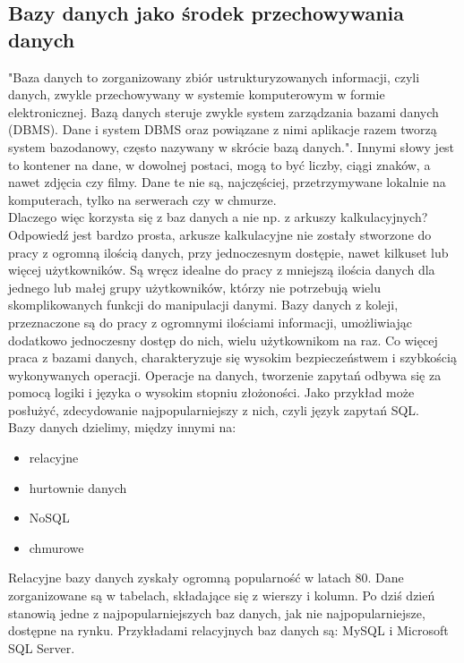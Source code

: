\documentclass[12pt]{article}
\begin{document}
\begin{sloppypar}
{  \subsection{Bazy danych jako środek przechowywania danych}
  {
    "Baza danych to zorganizowany zbiór ustrukturyzowanych informacji, czyli danych, zwykle przechowywany w systemie komputerowym w formie elektronicznej. 
    Bazą danych steruje zwykle system zarządzania bazami danych (DBMS). 
    Dane i system DBMS oraz powiązane z nimi aplikacje razem tworzą system bazodanowy, często nazywany w skrócie bazą danych.". \cite{oracle-db}
    Innymi słowy jest to kontener na dane, w dowolnej postaci, mogą to być liczby, ciągi znaków, a nawet zdjęcia czy filmy. Dane te nie są, najczęściej, przetrzymywane
    lokalnie na komputerach, tylko na serwerach czy w chmurze. \\
    Dlaczego więc korzysta się z baz danych a nie np. z arkuszy kalkulacyjnych?\\
    Odpowiedź jest bardzo prosta, arkusze kalkulacyjne nie zostały stworzone do pracy z ogromną ilością danych, przy jednoczesnym dostępie, nawet kilkuset lub więcej użytkowników.
    Są wręcz idealne do pracy z mniejszą ilościa danych dla jednego lub małej grupy użytkowników, którzy nie potrzebują wielu skomplikowanych funkcji do manipulacji danymi.
    Bazy danych z koleji, przeznaczone są do pracy z ogromnymi ilościami informacji, umożliwiając dodatkowo jednoczesny dostęp do nich, wielu użytkownikom na raz. 
    Co więcej praca z bazami danych, charakteryzuje się wysokim bezpieczeństwem i szybkością wykonywanych operacji. Operacje na danych, tworzenie zapytań odbywa się 
    za pomocą logiki i języka o wysokim stopniu złożoności. Jako przykład może posłużyć, zdecydowanie najpopularniejszy z nich, czyli język zapytań SQL.\\
    Bazy danych dzielimy, między innymi na:
    \begin{itemize}
      \item relacyjne
      \item hurtownie danych
      \item NoSQL
      \item chmurowe
    \end{itemize}
    Relacyjne bazy danych zyskały ogromną popularność w latach 80\cite{oracle-db}. Dane zorganizowane są w tabelach, składające się z wierszy i kolumn. Po dziś dzień stanowią 
    jedne z najpopularniejszych baz danych, jak nie najpopularniejsze, dostępne na rynku. Przykładami relacyjnych baz danych są: MySQL i Microsoft SQL Server.\\
}}
\end{sloppypar}
\end{document}
